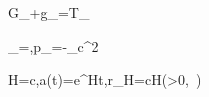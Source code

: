 G_{\mu\nu}+\Lambda g_{\mu\nu}=T_{\mu\nu}

\rho_\Lambda=,\qquad p_\Lambda=-\rho_\Lambda c^2

H=c,\qquad a(t)=e^{Ht},\qquad r_H=\frac cH\quad(\Lambda>0,\ )
